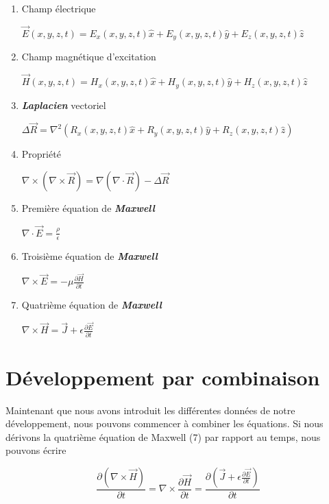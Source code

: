 \begin{enumerate}
\item{Champ électrique} \begin{center}$\vec{E}(x,y,z,t) = E_{x}(x,y,z,t) \hat{x} + E_{y}(x,y,z,t) \hat{y} + E_{z}(x,y,z,t) \hat{z}$\end{center} 
\item{Champ magnétique d'excitation } \begin{center}$\vec{H}(x,y,z,t) = H_{x}(x,y,z,t) \hat{x} + H_{y}(x,y,z,t) \hat{y} + H_{z}(x,y,z,t) \hat{z}$\end{center} 
\item{\textit{\textbf{Laplacien}} vectoriel} \begin{center} $\Delta \vec{R} = \nabla^{2}(R_{x}(x,y,z,t) \hat{x} + R_{y}(x,y,z,t) \hat{y} + R_{z}(x,y,z,t) \hat{z}) $\end{center} 
\item{Propriété} 
\begin{center}$\nabla \times (\nabla \times \vec{R}) = \nabla(\nabla \cdot \vec{R}) - \Delta \vec{R} $\end{center} 
\item{Première équation de \textit{\textbf{Maxwell}}} 
\begin{center}$\nabla \cdot \vec{E} = \frac{\rho}{\epsilon}$\end{center} 
\item{Troisième équation de \textit{\textbf{Maxwell}}}
\begin{center}
$\nabla \times \vec{E} = - \mu \frac{\partial \vec{H}}{\partial t}$
\end{center} 
\item{Quatrième équation de \textit{\textbf{Maxwell}}} \begin{center} $\nabla \times \vec{H} =  \vec{J} + \epsilon \frac{\partial \vec{E}}{\partial t}$\end{center} 
\end{enumerate}
\section{Développement par combinaison}

Maintenant que nous avons introduit les différentes données de notre développement, nous pouvons  commencer à combiner les équations. 
Si nous dérivons la quatrième équation de Maxwell (7) par rapport au temps, nous pouvons écrire 

\[ \frac{\partial (\nabla \times \vec{H})}{\partial t} = \nabla \times \frac{\partial \vec{H}}{\partial t} = \frac{\partial(\vec{J} + \epsilon \frac{\partial \vec{E}}{\partial t})}{\partial t} \]

